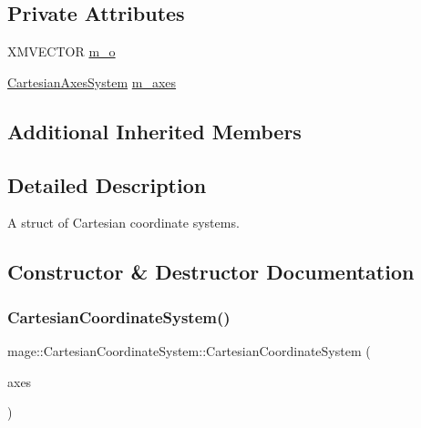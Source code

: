 \subsection*{Private Attributes}
\begin{DoxyCompactItemize}
\item 
X\+M\+V\+E\+C\+T\+OR \hyperlink{structmage_1_1_cartesian_coordinate_system_a1ea373bb91be991ee221a2ce1e02be2b}{m\+\_\+o}
\item 
\hyperlink{structmage_1_1_cartesian_axes_system}{Cartesian\+Axes\+System} \hyperlink{structmage_1_1_cartesian_coordinate_system_acf7b8cf35026f5fa8fc11a126b96b055}{m\+\_\+axes}
\end{DoxyCompactItemize}
\subsection*{Additional Inherited Members}


\subsection{Detailed Description}
A struct of Cartesian coordinate systems. 

\subsection{Constructor \& Destructor Documentation}
\hypertarget{structmage_1_1_cartesian_coordinate_system_a3f4a3309daccc818f06400a44f70b09b}{}\label{structmage_1_1_cartesian_coordinate_system_a3f4a3309daccc818f06400a44f70b09b} 
\subsubsection{\texorpdfstring{Cartesian\+Coordinate\+System()}{CartesianCoordinateSystem()}\hspace{0.1cm}{\footnotesize\ttfamily [1/4]}}
{\footnotesize\ttfamily mage\+::\+Cartesian\+Coordinate\+System\+::\+Cartesian\+Coordinate\+System (\begin{DoxyParamCaption}\item[{const \hyperlink{structmage_1_1_cartesian_axes_system}{Cartesian\+Axes\+System} \&}]{axes }\end{DoxyParamCaption})\hspace{0.3cm}{\ttfamily [explicit]}}

